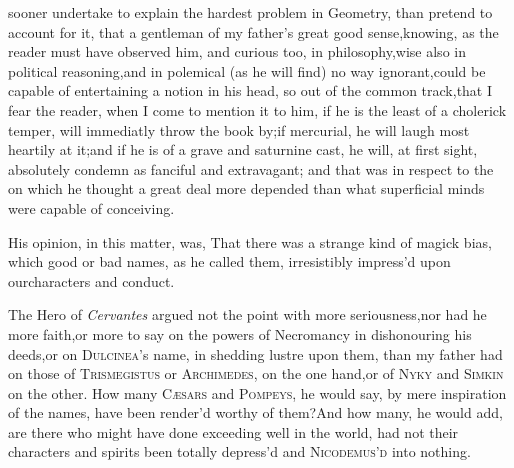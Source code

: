 \documentclass{article}
\begin{document}
 sooner undertake to explain
the hardest problem in Geometry,\break
than pretend to account for it, that a\break
gentleman of my father’s great good
sense,\tsh  knowing, as the reader must have observed him,
and curious too, in philosophy,\tsk  wise also in political
reasoning,\tsk  and in polemical (as he will find) no way
ignorant,\tsk  could be capable of entertaining a notion in his
head, so out of the common track,\tsk  that I fear the reader,
when I come to mention it to him, if he is the least of a cholerick
temper, will immediatly throw the book by;\break if mercurial, he will
laugh most heartily at it;\tsk  and if he is of a grave and
saturnine cast, he will, at first sight, absolutely condemn as
fanciful and extravagant; and that was in respect to
the  on which he thought a great deal
more depended than what superficial minds were capable of
conceiving.

His opinion, in this matter, was, That there was a strange kind
of magick bias, which good or bad names, as he called them,
irresistibly impress’d upon our\break cha\-racters and conduct.

The Hero of \textit{Cervantes} argued not the point with more
seriousness,\tsk  nor had\break 
he more faith,\tsh  or more to say on the\break
powers of Necromancy in dishonouring his
deeds,\tsk  or on \textsc{Dulcinea}’s name, in
shedding lustre upon them, than my father had on those of
\textsc{Trismegistus} or \textsc{Archimedes}, on the
one hand,\tsk  or of \textsc{Nyky} and \textsc{Simkin}
on the other. How many \textsc{Cæsars} and
\textsc{Pompeys}, he would say, by mere inspiration of the
names, have been render’d worthy of them?\break And how many, he would
add, are there who might have done exceeding well in the world,
had not their characters and 
spirits been totally depress’d and \textsc{Nico\-demus’d} into
nothing.
\end{document}
